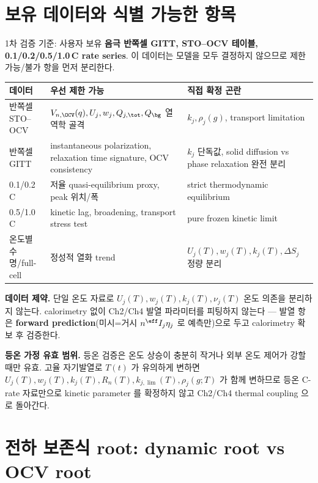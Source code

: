 \section{보유 데이터와 식별 가능한 항목}\label{sec:ch6_data}
1차 검증 기준: 사용자 보유 \textbf{음극 반쪽셀 GITT, STO--OCV 테이블, 0.1/0.2/0.5/1.0\,C rate series}. 이
데이터는 모델을 모두 결정하지 않으므로 제한 가능/불가 항을 먼저 분리한다.
\begin{longtable}{p{} p{} p{}}
\toprule 데이터 & 우선 제한 가능 & 직접 확정 곤란 \\ \midrule \endhead
반쪽셀 STO--OCV & $V_{n,\OCV}(q),U_j,w_j,Q_{j,\tot},Q_\bg$ 열역학 골격 & $k_j,\rho_j(g)$, transport limitation \\
반쪽셀 GITT & instantaneous polarization, relaxation time signature, OCV consistency & $k_j$ 단독값, solid diffusion vs phase relaxation 완전 분리 \\
0.1/0.2\,C & 저율 quasi-equilibrium proxy, peak 위치/폭 & strict thermodynamic equilibrium \\
0.5/1.0\,C & kinetic lag, broadening, transport stress test & pure frozen kinetic limit \\
온도별 수명/full-cell & 정성적 열화 trend & $U_j(T),w_j(T),k_j(T),\Delta S_j$ 정량 분리 \\
\bottomrule
\end{longtable}
\begin{boundbox}
\textbf{데이터 제약.} 단일 온도 자료로 $U_j(T),w_j(T),k_j(T),\nu_j(T)$ 온도 의존을 분리하지 않는다.
calorimetry 없이 Ch2/Ch4 발열 파라미터를 피팅하지 않는다 — 발열 항은 \textbf{forward prediction}(미시=거시
$n^{\eff}I_j\eta_j$ 로 예측만)으로 두고 calorimetry 확보 후 검증한다.
\end{boundbox}
\begin{boundbox}
\textbf{등온 가정 유효 범위.} 등온 검증은 온도 상승이 충분히 작거나 외부 온도 제어가 강할 때만 유효. 고율
자기발열로 $T(t)$ 가 유의하게 변하면 $U_j(T),w_j(T),k_j(T),R_n(T),k_{j,\lim}(T),\rho_j(g;T)$ 가 함께 변하므로
등온 C-rate 자료만으로 kinetic parameter 를 확정하지 않고 Ch2/Ch4 thermal coupling 으로 돌아간다.
\end{boundbox}

\section{전하 보존식 root: dynamic root vs OCV root}\label{sec:ch6_root}

